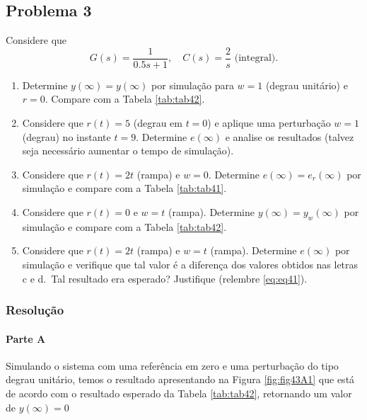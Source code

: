 \documentclass[
]{book}
\providecommand{\tightlist}{%
  \setlength{\itemsep}{0pt}\setlength{\parskip}{0pt}}
\begin{document}
\hypertarget{problema-3}{%
\subsection*{Problema 3}\label{problema-3}}

Considere que
\[
G(s) = \frac {1}{0.5s +1}, \quad C(s) = \frac {2}{s} \text{ (integral)}.
\]

\begin{enumerate}
\def\labelenumi{\alph{enumi}.}
\tightlist
\item
  Determine \(y(\infty) = y(\infty)\) por simulação para \(w =1\) (degrau unitário) e \(r=0\). Compare com a Tabela \ref{tab:tab42}.
\item
  Considere que \(r(t) = 5\) (degrau em \(t=0\)) e aplique uma perturbação \(w=1\) (degrau) no instante \(t=9\). Determine \(e(\infty)\) e analise os resultados (talvez seja necessário aumentar o tempo de simulação).
\item
  Considere que \(r(t) = 2t\) (rampa) e \(w=0\). Determine \(e(\infty) = e_r(\infty)\) por simulação e compare com a Tabela \ref{tab:tab41}.
\item
  Considere que \(r(t) = 0\) e \(w=t\) (rampa). Determine \(y(\infty) = y_w(\infty)\) por simulação e compare com a Tabela \ref{tab:tab42}.
\item
  Considere que \(r(t) = 2t\) (rampa) e \(w=t\) (rampa). Determine \(e(\infty)\) por simulação e verifique que tal valor é a diferença dos valores obtidos nas letras c e d.~Tal resultado era esperado? Justifique (relembre \eqref{eq:eq41}).
\end{enumerate}

\hypertarget{resoluuxe7uxe3o-1}{%
\subsubsection*{Resolução}\label{resoluuxe7uxe3o-1}}

\hypertarget{parte-a-2}{%
\paragraph*{Parte A}\label{parte-a-2}}

Simulando o sistema com uma referência em zero e uma perturbação do tipo degrau unitário, temos o resultado apresentando na Figura \ref{fig:fig43A1} que está de acordo com o resultado esperado da Tabela \ref{tab:tab42}, retornando um valor de \(y(\infty) = 0\)
\end{document}
